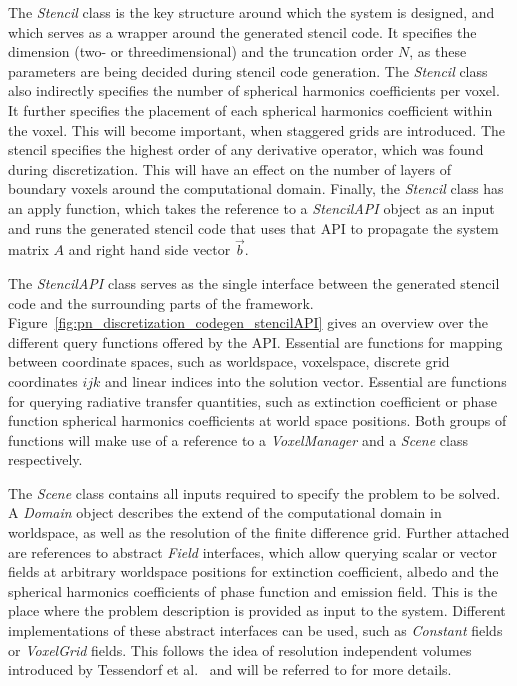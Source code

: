 The \emph{Stencil} class is the key structure around which the system is designed, and which serves as a wrapper around the generated stencil code. It specifies the dimension (two- or threedimensional) and the truncation order $N$, as these parameters are being decided during stencil code generation. The \emph{Stencil} class also indirectly specifies the number of spherical harmonics coefficients per voxel. It further specifies the placement of each spherical harmonics coefficient within the voxel. This will become important, when staggered grids are introduced. The stencil specifies the highest order of any derivative operator, which was found during discretization. This will have an effect on the number of layers of boundary voxels around the computational domain. Finally, the \emph{Stencil} class has an apply function, which takes the reference to a \emph{StencilAPI} object as an input and runs the generated stencil code that uses that API to propagate the system matrix $A$ and right hand side vector $\vec{b}$.

The \emph{StencilAPI} class serves as the single interface between the generated stencil code and the surrounding parts of the framework. Figure~\ref{fig:pn_discretization_codegen_stencilAPI} gives an overview over the different query functions offered by the API. Essential are functions for mapping between coordinate spaces, such as worldspace, voxelspace, discrete grid coordinates $ijk$ and linear indices into the solution vector. Essential are functions for querying radiative transfer quantities, such as extinction coefficient or phase function spherical harmonics coefficients at world space positions. Both groups of functions will make use of a reference to a \emph{VoxelManager} and a \emph{Scene} class respectively.

The \emph{Scene} class contains all inputs required to specify the problem to be solved. A \emph{Domain} object describes the extend of the computational domain in worldspace, as well as the resolution of the finite difference grid. Further attached are references to abstract \emph{Field} interfaces, which allow querying scalar or vector fields at arbitrary worldspace positions for extinction coefficient, albedo and the spherical harmonics coefficients of phase function and emission field. This is the place where the problem description is provided as input to the system. Different implementations of these abstract interfaces can be used, such as \emph{Constant} fields or \emph{VoxelGrid} fields. This follows the idea of resolution independent volumes introduced by Tessendorf et al.~\cite{Tessendorf11} and will be referred to for more details.

